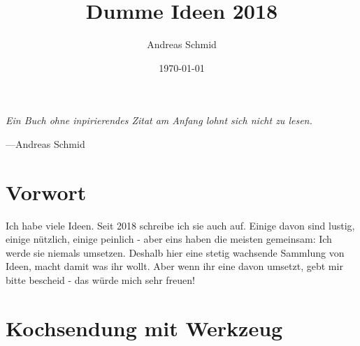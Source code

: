 \documentclass[a5paper,pagesize,10pt,bibtotoc,pointlessnumbers,normalheadings,DIV=9,twoside=false]{scrbook}
\title{Dumme Ideen 2018}
\author{Andreas Schmid}
\date{\today}
\begin{document}

\maketitle

\newpage{}
\thispagestyle {empty}

\vspace*{2cm}

\begin{center}
	\Large{\parbox{10cm}{
		\begin{raggedright}
		{\Large 
			\textit{Ein Buch ohne inpirierendes Zitat am Anfang lohnt sich nicht zu lesen.}
		}
	
		\vspace{.5cm}\hfill{---Andreas Schmid}
		\end{raggedright}
	}
}
\end{center}

\newpage


\singlespacing
\tableofcontents 

\onehalfspacing

\chapter*{Vorwort}
Ich habe viele Ideen.
Seit 2018 schreibe ich sie auch auf.
Einige davon sind lustig, einige nützlich, einige peinlich - aber eins haben die meisten gemeinsam: Ich werde sie niemals umsetzen.
Deshalb hier eine stetig wachsende Sammlung von Ideen, macht damit was ihr wollt.
Aber wenn ihr eine davon umsetzt, gebt mir bitte bescheid - das würde mich sehr freuen!

\chapter{Kochsendung mit Werkzeug}
\end{document}
